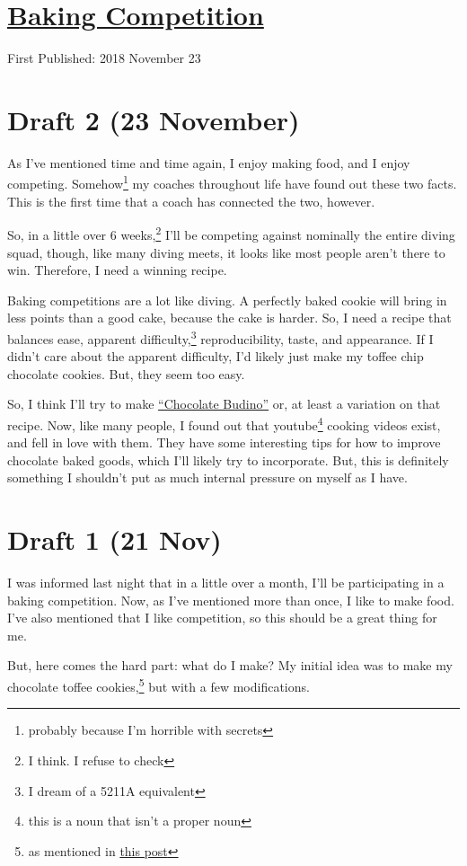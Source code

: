 \documentclass[12pt]{article}[titlepage]
\newcommand{\say}[1]{``#1''}
\newcommand{\1}{\={a}}
\newcommand{\2}{\={e}}
\newcommand{\3}{\={\i}}
\newcommand{\4}{\=o}
\newcommand{\5}{\=u}
\newcommand{\6}{\={A}}
\renewcommand{\,}{\textsuperscript{,}}
\begin{document}
\doublespacing
\section{\href{baking-competition.html}{Baking Competition}}
First Published: 2018 November 23
\section{Draft 2 (23 November)}
As I've mentioned time and time again, I enjoy making food, and I enjoy competing.
Somehow\footnote{probably because I'm horrible with secrets} my coaches throughout life have found out these two facts.
This is the first time that a coach has connected the two, however.

So, in a little over 6 weeks,\footnote{I think. I refuse to check} I'll be competing against nominally the entire diving squad, though, like many diving meets, it looks like most people aren't there to win.
Therefore, I need a winning recipe.

Baking competitions are a lot like diving.
A perfectly baked cookie will bring in less points than a good cake, because the cake is harder.
So, I need a recipe that balances ease, apparent difficulty,\footnote{I dream of a 5211A equivalent} reproducibility, taste, and appearance.
If I didn't care about the apparent difficulty, I'd likely just make my toffee chip chocolate cookies.
But, they seem too easy.

So, I think I'll try to make \href{http://catcora.com/recipes/desserts/chocolate-budino/}{\say{Chocolate Budino}} or, at least a variation on that recipe.
Now, like many people, I found out that youtube\footnote{this is a noun that isn't a proper noun} cooking videos exist, and fell in love with them.
They have some interesting tips for how to improve chocolate baked goods, which I'll likely try to incorporate.
But, this is definitely something I shouldn't put as much internal pressure on myself as I have.

\section{Draft 1 (21 Nov)}
I was informed last night that in a little over a month, I'll be participating in a baking competition.
Now, as I've mentioned more than once, I like to make food.
I've also mentioned that I like competition, so this should be a great thing for me.

But, here comes the hard part: what do I make?
My initial idea was to make my chocolate toffee cookies,\footnote{as mentioned in \href{toffee-recipe.html}{this post}} but with a few modifications.
\end{document}
